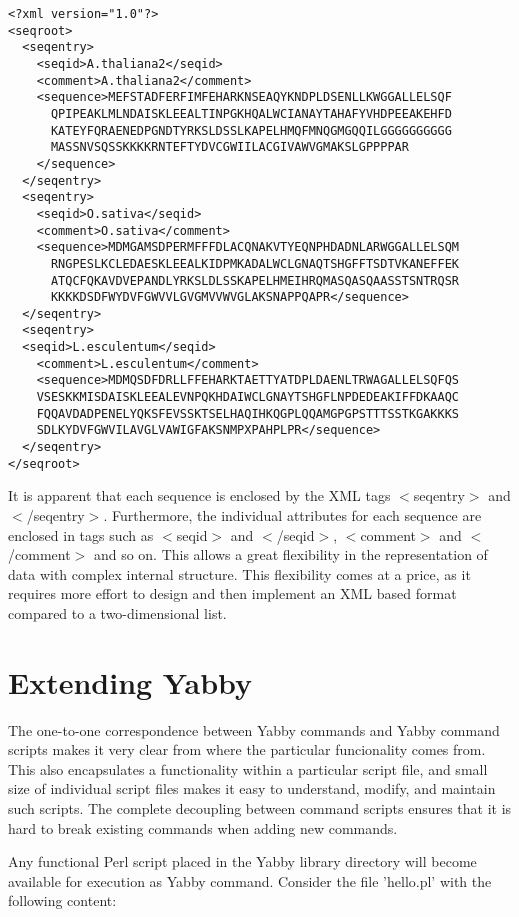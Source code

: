 \begin{verbatim}
<?xml version="1.0"?>
<seqroot>
  <seqentry>
    <seqid>A.thaliana2</seqid>
    <comment>A.thaliana2</comment>
    <sequence>MEFSTADFERFIMFEHARKNSEAQYKNDPLDSENLLKWGGALLELSQF
      QPIPEAKLMLNDAISKLEEALTINPGKHQALWCIANAYTAHAFYVHDPEEAKEHFD
      KATEYFQRAENEDPGNDTYRKSLDSSLKAPELHMQFMNQGMGQQILGGGGGGGGGG
      MASSNVSQSSKKKKRNTEFTYDVCGWIILACGIVAWVGMAKSLGPPPPAR
    </sequence>
  </seqentry>
  <seqentry>
    <seqid>O.sativa</seqid>
    <comment>O.sativa</comment>
    <sequence>MDMGAMSDPERMFFFDLACQNAKVTYEQNPHDADNLARWGGALLELSQM
      RNGPESLKCLEDAESKLEEALKIDPMKADALWCLGNAQTSHGFFTSDTVKANEFFEK
      ATQCFQKAVDVEPANDLYRKSLDLSSKAPELHMEIHRQMASQASQAASSTSNTRQSR
      KKKKDSDFWYDVFGWVVLGVGMVVWVGLAKSNAPPQAPR</sequence>
  </seqentry>
  <seqentry>
  <seqid>L.esculentum</seqid>
    <comment>L.esculentum</comment>
    <sequence>MDMQSDFDRLLFFEHARKTAETTYATDPLDAENLTRWAGALLELSQFQS
    VSESKKMISDAISKLEEALEVNPQKHDAIWCLGNAYTSHGFLNPDEDEAKIFFDKAAQC
    FQQAVDADPENELYQKSFEVSSKTSELHAQIHKQGPLQQAMGPGPSTTTSSTKGAKKKS
    SDLKYDVFGWVILAVGLVAWIGFAKSNMPXPAHPLPR</sequence>
  </seqentry>
</seqroot>
\end{verbatim}

It is apparent that each sequence is enclosed by the XML tags
$<$seqentry$>$ and $<$/seqentry$>$. Furthermore, the individual
attributes for each sequence are enclosed in tags such as
$<$seqid$>$ and $<$/seqid$>$, $<$comment$>$ and $<$/comment$>$
and so on. This allows a great flexibility in the representation
of data with complex internal structure. This flexibility comes
at a price, as it requires more effort to design and then implement
an XML based format compared to a two-dimensional list. 

\section{Extending Yabby}

The one-to-one correspondence between Yabby commands and Yabby
command scripts makes it very clear from where the particular
funcionality comes from. This also encapsulates a functionality
within a particular script file, and small size of individual
script files makes it easy to understand, modify, and maintain
such scripts.  The complete decoupling between command scripts
ensures that it is hard to break existing commands when adding
new commands.

Any functional Perl script placed in the Yabby library directory
will become available for execution as Yabby command.  Consider
the file 'hello.pl' with the following content:

